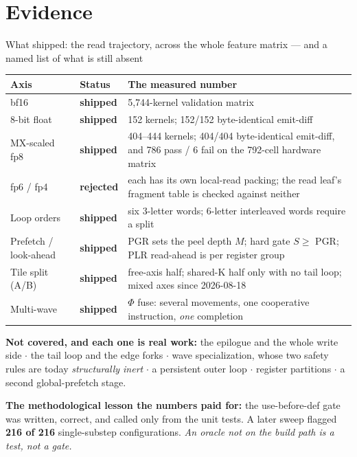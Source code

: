 \documentclass[aspectratio=169,9pt]{beamer}
\newcommand{\tsub}[1]{{\footnotesize\color{gray}#1}}
\newcommand{\key}[1]{\textcolor{acc}{\textbf{#1}}}
\newcommand{\bad}[1]{\textcolor{warn}{\textbf{#1}}}
\newcommand{\good}[1]{\textcolor{ok}{\textbf{#1}}}
\begin{document}
\section{Evidence}
\begin{frame}{What shipped: the read trajectory, across the whole feature matrix --- and a named list of what is still absent}

{\scriptsize
\begin{tabular}{@{}llp{58mm}@{}}
\toprule
\textbf{Axis} & \textbf{Status} & \textbf{The measured number} \\
\midrule
bf16                  & \good{shipped}  & 5{,}744-kernel validation matrix \\
8-bit float           & \good{shipped}  & 152 kernels; 152/152 byte-identical emit-diff \\
MX-scaled fp8         & \good{shipped}  & 404--444 kernels; 404/404 byte-identical emit-diff, and 786 pass / 6 fail on the 792-cell hardware matrix \\
fp6 / fp4             & \bad{rejected}  & each has its own local-read packing; the read leaf's fragment table is checked against neither \\
Loop orders           & \good{shipped}  & six 3-letter words; 6-letter interleaved words require a split \\
Prefetch / look-ahead & \good{shipped}  & PGR sets the peel depth $M$; hard gate $S \ge$ PGR; PLR read-ahead is per register group \\
Tile split \tsub{(A/B)} & \good{shipped} & free-axis half; shared-K half only with no tail loop; mixed axes since 2026-08-18 \\
Multi-wave            & \good{shipped}  & $\Phi$ fuse: several movements, one cooperative instruction, \emph{one} completion \\
\bottomrule
\end{tabular}}

\vspace{2mm}
{\scriptsize \bad{Not covered, and each one is real work:} the epilogue and the whole write side
$\cdot$ the tail loop and the edge forks $\cdot$ wave specialization, whose two safety rules are
today \emph{structurally inert} $\cdot$ a persistent outer loop $\cdot$ register partitions $\cdot$
a second global-prefetch stage.}

\vspace{1mm}
{\scriptsize \key{The methodological lesson the numbers paid for:} the use-before-def gate was
written, correct, and called only from the unit tests. A later sweep flagged \key{216 of 216}
single-substep configurations. \emph{An oracle not on the build path is a test, not a gate.}}

\end{frame}
\end{document}
